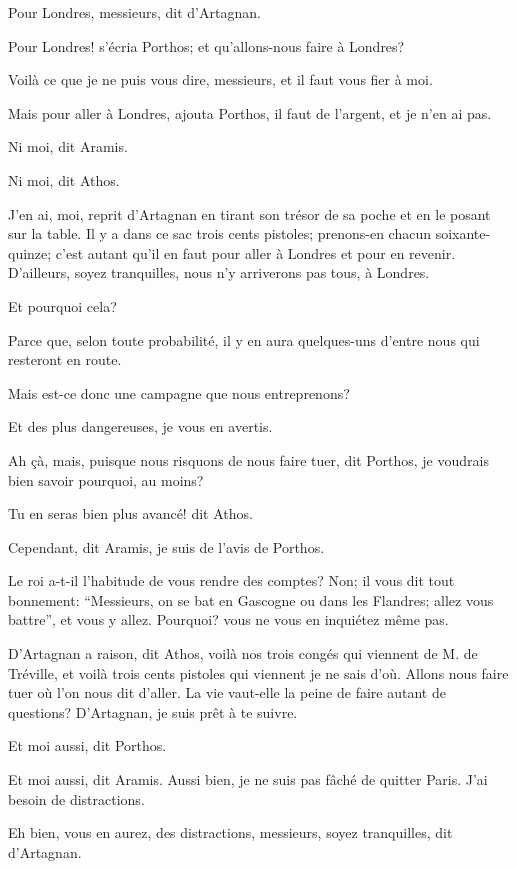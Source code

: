 \speak  Pour Londres, messieurs, dit d'Artagnan. 

\speak  Pour Londres! s'écria Porthos; et qu'allons-nous faire à Londres? 

\speak  Voilà ce que je ne puis vous dire, messieurs, et il faut vous fier à moi. 

\speak  Mais pour aller à Londres, ajouta Porthos, il faut de l'argent, et je n'en ai pas. 

\speak  Ni moi, dit Aramis. 

\speak  Ni moi, dit Athos. 

\speak  J'en ai, moi, reprit d'Artagnan en tirant son trésor de sa poche et en le posant sur la table. Il y a dans ce sac trois cents pistoles; prenons-en chacun soixante-quinze; c'est autant qu'il en faut pour aller à Londres et pour en revenir. D'ailleurs, soyez tranquilles, nous n'y arriverons pas tous, à Londres. 

\speak  Et pourquoi cela? 

\speak  Parce que, selon toute probabilité, il y en aura quelques-uns d'entre nous qui resteront en route. 

\speak  Mais est-ce donc une campagne que nous entreprenons? 

\speak  Et des plus dangereuses, je vous en avertis. 

\speak  Ah çà, mais, puisque nous risquons de nous faire tuer, dit Porthos, je voudrais bien savoir pourquoi, au moins? 

\speak  Tu en seras bien plus avancé! dit Athos. 

\speak  Cependant, dit Aramis, je suis de l'avis de Porthos. 

\speak  Le roi a-t-il l'habitude de vous rendre des comptes? Non; il vous dit tout bonnement: “Messieurs, on se bat en Gascogne ou dans les Flandres; allez vous battre”, et vous y allez. Pourquoi? vous ne vous en inquiétez même pas. 

\speak  D'Artagnan a raison, dit Athos, voilà nos trois congés qui viennent de M. de Tréville, et voilà trois cents pistoles qui viennent je ne sais d'où. Allons nous faire tuer où l'on nous dit d'aller. La vie vaut-elle la peine de faire autant de questions? D'Artagnan, je suis prêt à te suivre. 

\speak  Et moi aussi, dit Porthos. 

\speak  Et moi aussi, dit Aramis. Aussi bien, je ne suis pas fâché de quitter Paris. J'ai besoin de distractions. 

\speak  Eh bien, vous en aurez, des distractions, messieurs, soyez tranquilles, dit d'Artagnan. 

